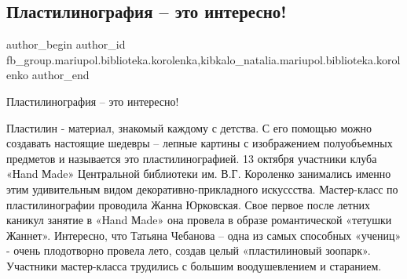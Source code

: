  
 
 
 
 

\subsection{Пластилинография – это интересно!}
\label{sec:13_10_2018.fb.fb_group.mariupol.biblioteka.korolenka.1.plastilinografiya___}
 
\ifcmt
 author_begin
   author_id fb_group.mariupol.biblioteka.korolenka,kibkalo_natalia.mariupol.biblioteka.korolenko
 author_end
\fi

Пластилинография – это интересно!

Пластилин - материал, знакомый каждому с детства. С его помощью можно создавать
настоящие шедевры – лепные картины с изображением полуобъемных предметов и
называется  это пластилинографией. 13 октября  участники клуба «Нand Мade»
Центральной библиотеки им. В.Г. Короленко занимались именно этим удивительным
видом декоративно-прикладного искуссства. Мастер-класс по пластилинографии
проводила Жанна Юрковская. Свое первое после летних каникул занятие в «Нand
Мade» она провела в образе романтической «тетушки Жаннет». Интересно, что
Татьяна Чебанова – одна из самых способных «учениц» - очень плодотворно провела
лето, создав целый «пластилиновый зоопарк». Участники мастер-класса трудились с
большим воодушевлением  и  старанием.
